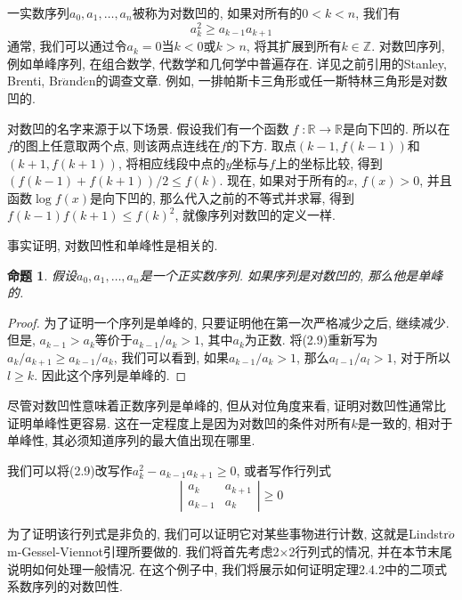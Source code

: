 \documentclass{ctexbook}
\newtheorem{proposition}[thm]{命题}
\begin{document}
	一实数序列$a_{0},a_{1},\ldots,a_{n}$被称为对数凹的, 如果对所有的$0<k<n$, 我们有
\begin{equation}
a_{k}^{2} \geq a_{k-1}a_{k+1}
\end{equation}
	通常, 我们可以通过令$a_{k}=0$当$k<0$或$k>n$, 将其扩展到所有$k\in \mathbb{Z}$. 对数凹序列, 例如单峰序列, 在组合数学, 代数学和几何学中普遍存在. 详见之前引用的Stanley, Brenti, Br$\ddot{a}$nd$\acute{e}$n的调查文章. 例如, 一排帕斯卡三角形或任一斯特林三角形是对数凹的.

	对数凹的名字来源于以下场景. 假设我们有一个函数$\operatorname{\mathit{f}}:\mathbb{R} \rightarrow \mathbb{R}$是向下凹的. 所以在$\mathit{f}$的图上任意取两个点, 则该两点连线在$\mathit{f}$的下方. 取点$(k-1,f(k-1))$和$(k+1,f(k+1))$, 将相应线段中点的$y$坐标与$\mathit{f}$上的坐标比较, 得到$(f(k-1)+f(k+1))/2\leq f(k)$. 现在, 如果对于所有的$x$, $f(x)>0$, 并且函数$\operatorname{log}f(x)$是向下凹的, 那么代入之前的不等式并求幂, 得到$f(k-1)f(k+1)\leq f(k)^{2}$, 就像序列对数凹的定义一样.

	事实证明, 对数凹性和单峰性是相关的.
\begin{proposition}
	假设$a_{0},a_{1},\ldots,a_{n}$是一个正实数序列. 如果序列是对数凹的, 那么他是单峰的.
\end{proposition}
\begin{proof}
	为了证明一个序列是单峰的, 只要证明他在第一次严格减少之后, 继续减少. 但是, $a_{k-1}>a_{k}$等价于$a_{k-1}/a_{k}>1$, 其中$a_{k}$为正数. 将(2.9)重新写为$a_{k}/a_{k+1}\geq a_{k-1}/a_{k}$, 我们可以看到, 如果$a_{k-1}/a_{k}>1$, 那么$a_{l-1}/a_{l}>1$, 对于所以$l\geq k$. 因此这个序列是单峰的. 
\end{proof}


	尽管对数凹性意味着正数序列是单峰的, 但从对位角度来看, 证明对数凹性通常比证明单峰性更容易. 这在一定程度上是因为对数凹的条件对所有$k$是一致的, 相对于单峰性, 其必须知道序列的最大值出现在哪里.

	我们可以将(2.9)改写作$a_{k}^{2}-a_{k-1}a_{k+1}\geq 0$, 或者写作行列式
\begin{equation}
\left|\begin{array}{cc}a_{k} & a_{k+1} \\
a_{k-1} & a_{k}
\end{array}\right| \geq 0
\end{equation}

	为了证明该行列式是非负的, 我们可以证明它对某些事物进行计数, 这就是Lindstr$\ddot{o}$m-Gessel-Viennot引理所要做的. 我们将首先考虑2$\times$2行列式的情况, 并在本节末尾说明如何处理一般情况. 在这个例子中, 我们将展示如何证明定理2.4.2中的二项式系数序列的对数凹性.
\end{document}
